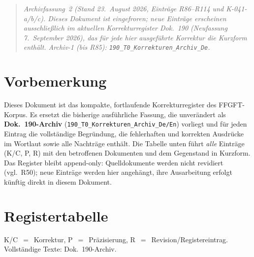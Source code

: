
\begin{quote}\itshape
Archivfassung~2 (Stand 23.~August 2026, Einträge R86--R114 und K-041-a/b/c).
Dieses Dokument ist eingefroren; neue Einträge erscheinen ausschließlich
im aktuellen Korrekturregister Dok.~190 (Neufassung 7.~September 2026),
das für jede hier ausgeführte Korrektur die Kurzform enthält.
Archiv-1 (bis R85): \texttt{190\_T0\_Korrekturen\_Archiv\_De}.
\end{quote}

\medskip

\providecommand{\QM}{\textbf{[Q]}}
\section*{Vorbemerkung}

Dieses Dokument ist das kompakte, fortlaufende Korrekturregister des FFGFT-Korpus. Es ersetzt die bisherige ausf\"uhrliche Fassung, die unver\"andert als \textbf{Dok.~190-Archiv} (\texttt{190\_T0\_Korrekturen\_Archiv\_De/En}) vorliegt und f\"ur jeden Eintrag die vollst\"andige Begr\"undung, die fehlerhaften und korrekten Ausdr\"ucke im Wortlaut sowie alle Nachtr\"age enth\"alt. Die Tabelle unten f\"uhrt \emph{alle} Eintr\"age (K/C, P, R) mit den betroffenen Dokumenten und dem Gegenstand in Kurzform. Das Register bleibt append-only: Quelldokumente werden nicht revidiert (vgl.\ R50); neue Eintr\"age werden hier angeh\"angt, ihre Ausarbeitung erfolgt k\"unftig direkt in diesem Dokument.

\section{Registertabelle}

\noindent K/C~$=$~Korrektur, P~$=$~Pr\"azisierung, R~$=$~Revision/Registereintrag. Vollst\"andige Texte: Dok.~190-Archiv.

